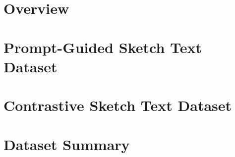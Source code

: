 \section{Overview}


\section{Prompt-Guided Sketch Text Dataset}


\section{Contrastive Sketch Text Dataset}


\section{Dataset Summary}

